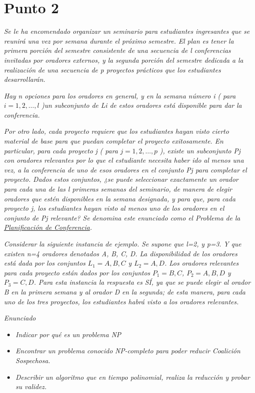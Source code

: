\section{Punto 2}
\textit{Se le ha encomendado organizar un seminario para estudiantes ingresantes que se
reunirá una vez por semana durante el próximo semestre. El plan es tener la primera
porción del semestre consistente de una secuencia de l conferencias invitadas por
oradores externos, y la segunda porción del semestre dedicada a la realización de una
secuencia de p proyectos prácticos que los estudiantes desarrollarán.
}

\textit{Hay n opciones para los oradores en general, y en la semana número i ( para $i = 1,2,\ldots,l$ )un subconjunto de Li de estos oradores está disponible para dar la conferencia.
}

\textit{Por otro lado, cada proyecto requiere que los estudiantes hayan visto cierto material de
base para que puedan completar el proyecto exitosamente. En particular, para cada proyecto j ( para $j = 1,2,\ldots,p$ ), existe un subconjunto Pj con oradores relevantes por lo que el estudiante necesita haber ido al menos una vez, a la conferencia de uno de esos oradores en el conjunto Pj para completar el proyecto.
Dados estos conjuntos, ¿se puede seleccionar exactamente un orador para cada una de las l primeras semanas del seminario, de manera de elegir oradores que estén disponibles en la semana designada, y para que, para cada proyecto j, los estudiantes hayan visto al menos uno de los oradores en el conjunto de Pj relevante? Se denomina este enunciado como el Problema de la \underline{Planificación de Conferencia}.
}

\textit{Considerar la siguiente instancia de ejemplo. Se supone que l=2, y p=3. Y que existen n=4 oradores denotados A, B, C, D. La disponibilidad de los oradores está dada por los conjuntos $L_1={A,B,C}$ y $L_2={A,D}$. Los oradores relevantes para cada proyecto están dados por los conjuntos $P_1={B,C}$, $P_2={A,B,D}$ y $P_3={C,D}$. Para esta instancia la respuesta es SÍ, ya que se puede elegir al orador B en la primera semana y al orador D en la segunda; de esta manera, para cada uno de los tres proyectos, los estudiantes habrá visto a los oradores relevantes.
}

\textit{Enunciado}
\begin{itemize}
  \item \textit{Indicar por qué es un problema NP}
  \item \textit{Encontrar un problema conocido NP-completo para poder reducir Coalición Sospechosa.}
  \item \textit{Describir un algoritmo que en tiempo polinomial, realiza la reducción y probar su validez.}
\end{itemize}

